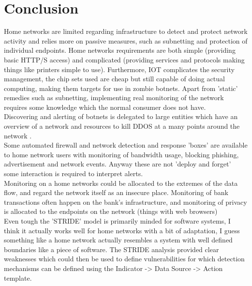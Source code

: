 \documentclass[
	letterpaper, %
	10pt, %
	unnumberedsections, %
	twoside, %
]{APAAssignment}
\begin{document}
\section{Conclusion}
Home networks are limited regarding infrastructure to detect and protect network activity and relies more on passive measures, such as subnetting and protection of individual endpoints. Home networks requirements are both simple (providing basic HTTP/S access) and complicated (providing services and protocols making things like printers simple to use). Furthermore, IOT complicates the security management, the chip sets used are cheap but still capable of doing actual computing, making them targets for use in zombie botnets.
Apart from 'static' remedies such as subnetting, implementing real monitoring of the network requires some knowledge which the normal consumer does not have. \\
Discovering and alerting of botnets is delegated to large entities which have an overview of a network and resources to kill DDOS at a many points around the network \cite{CloudFlareDDOS}. \\
Some automated firewall and network detection and response 'boxes'\cite{FireWallaCommerical} are available to home network users with monitoring of bandwidth usage, blocking phishing, advertisement and network events. Anyway these are not 'deploy and forget' some interaction is required to interpret alerts. \\
Monitoring on a home networks could be allocated to the extremes of the data flow, and regard the network itself as an insecure place. Monitoring of bank transactions often happen on the bank's infrastructure, and monitoring of privacy is allocated to the endpoints on the network (things with web browsers) \\
Even tough the 'STRIDE' model is primarily minded for software systems, I think it actually works well for home networks with a bit of adaptation, I guess something like a home network actually resembles a system with well defined boundaries like a piece of software. The STRIDE analysis provided clear weaknesses which could then be used to define vulnerabilities for which detection mechanisms can be defined using the Indicator -> Data Source -> Action template.
\end{document}
